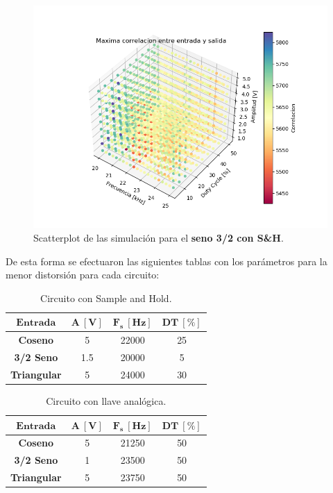 \begin{figure}[H]
\centering
	\includegraphics[width=0.8\linewidth]{ImagenesEjercicio6/scatter_sh_sen32.png}
	\caption{Scatterplot de las simulación para el \textbf{seno 3/2 con S\&H}.}
	\label{sen32_sh}
\end{figure}

De esta forma se efectuaron las siguientes tablas con los parámetros para la menor distorsión para cada circuito:
\begin{multicols}{2}
\begin{table}[H]
\centering
\begin{tabular}{cccc}
\hline
$\mathbf{Entrada}$  & $\mathbf{A \ [V]}$ & $\mathbf{F_s \ [Hz]}$ & $\mathbf{DT \ [\%]}$ \\ \hline
\textbf{Coseno}     & 5                 & 22000                 & 25                    \\
\textbf{3/2 Seno}   & 1.5                & 20000                 & 5                    \\
\textbf{Triangular} & 5                  & 24000                 & 30                  	\\ \hline
\end{tabular}
\caption{Circuito con Sample and Hold.}
\end{table}
\begin{table}[H]
\centering
\begin{tabular}{cccc}
\hline
$\mathbf{Entrada}$  & $\mathbf{A \ [V]}$ & $\mathbf{F_s \ [Hz]}$ & $\mathbf{DT \ [\%]}$ \\ \hline
\textbf{Coseno}     & 5                  & 21250                 & 50                   \\
\textbf{3/2 Seno}   & 1                  & 23500                 & 50                   \\
\textbf{Triangular} & 5                  & 23750                 & 50                   \\ \hline
\end{tabular}
\caption{Circuito con llave analógica.}
\end{table}
\end{multicols}

